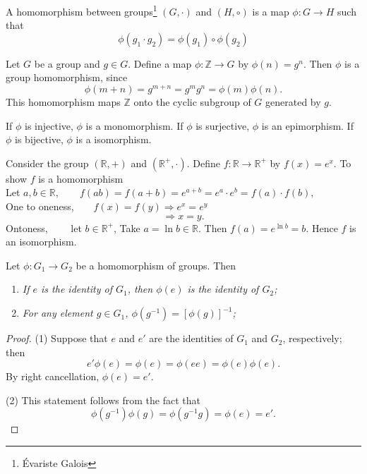 \begin{definition}
A homomorphism between groups\footnote{\'{E}variste Galois} $(G, \cdot)$ and $(H, \circ)$ is a map $\phi : G \rightarrow H$ such that
\[
\phi( g_1 \cdot g_2 ) = \phi( g_1 ) \circ \phi( g_2 )
\]
\end{definition}

\begin{example}
Let $G$ be a group and $g \in G$. Define a map $\phi : {\mathbb Z}
\rightarrow G$ by $\phi( n ) = g^n$. Then $\phi$ is a group
homomorphism, since
\[
\phi( m + n ) = g^{ m + n} = g^m g^n = \phi( m ) \phi( n ).
\]
This homomorphism maps ${\mathbb Z}$ onto the cyclic subgroup of $G$
generated by $g$.
\end{example}

If $\phi$ is injective, $\phi$ is a monomorphism. If $\phi$ is surjective, $\phi$ is an epimorphism. If $\phi$ is bijective, $\phi$ is a isomorphism.

\begin{example}
Consider the group $(\mathbb{R},+)$ and $(\mathbb{R}^+,\cdot)$. Define $f:\mathbb{R}\rightarrow \mathbb{R}^+$ by $f(x)=e^x$. To show $f$ is a homomorphism\\ Let $a,b\in \mathbb{R},\qquad f(ab)=f(a+b)=e^{a+b}=e^a\cdot e^b=f(a)\cdot f(b),$\\
One to oneness,$\qquad f(x)=f(y) \Rightarrow e^x=e^y$
$$ \Rightarrow x=y.$$
Ontoness,$\qquad$ let $b\in \mathbb{R}^+$, Take $a=\ln b \in \mathbb{R}$. Then
$f(a)=e^{\ln b}=b.$
Hence $f$ is an isomorphism.
\end{example}
\begin{proposition}
Let $\phi : G_1 \rightarrow G_2$ be a homomorphism of groups. Then
\begin{enumerate}

\rm \item \it
If $e$ is the identity of $G_1$, then $\phi( e)$ is the identity of
$G_2$;

\rm \item \it
For any element $g \in G_1$, $\phi( g^{-1}) = [\phi( g )]^{- 1}$;
\end{enumerate}
\end{proposition}

\begin{proof}
(1)
Suppose that $e$ and $e'$ are the identities of $G_1$ and $G_2$,
respectively; then
\[
e' \phi(e) = \phi(e) = \phi(e e) = \phi(e) \phi(e).
\]
By right cancellation, $\phi(e) = e'$.

(2)
This statement follows from the fact that
$$
\phi( g^{-1}) \phi(g) = \phi(g^{-1} g) = \phi(e) = e'.
$$
\end{proof}

